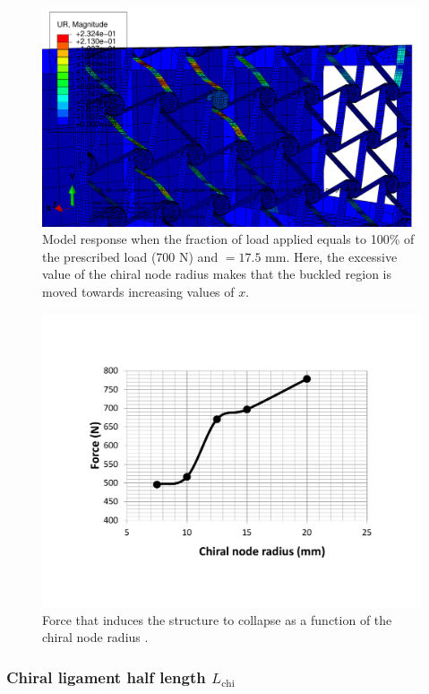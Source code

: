       \begin{figure}[!htpb] %
        \centering
        \includegraphics[width=0.8 \textwidth]{../figures/result-sim/r/17coma5-UR}
        \caption[Model response when the fraction of load applied equals to 100\% of the prescribed load (700 N) and \chir$ = 17.5$ mm]{Model response when the fraction of load applied equals to 100\% of the prescribed load (700 N) and \chir$ = 17.5$ mm. Here, the excessive value of the chiral node radius \chir makes that the buckled region is moved towards increasing values of $x$.}\label{fig:r17coma5-UR}
      \end{figure}

      \begin{figure}[!htpb] %
        \centering
        \includegraphics[width=0.8 \textwidth]{../figures/result-sim/r/force_r}
        \caption[Force that induces the structure to collapse as a function of the chiral node depth]{Force that induces the structure to collapse as a function of the chiral node radius \chir.}\label{fig:force_r}
      \end{figure}

    \clearpage
    \subsubsection{Chiral ligament half length $L_{\mathrm{chi}}$}


